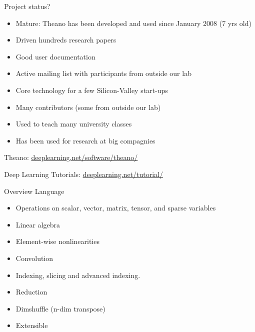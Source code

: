 \documentclass[utf8x,xcolor=pdftex,dvipsnames,table]{beamer}
\begin{document}



\begin{frame}{Project status?}
  \begin{itemize}
    \item Mature: Theano has been developed and used since January 2008 (7 yrs old)
    \item Driven hundreds research papers
    \item Good user documentation
    \item Active mailing list with participants from outside our lab
    \item Core technology for a few Silicon-Valley start-ups
    \item Many contributors (some from outside our lab)
    \item Used to teach many university classes
    \item Has been used for research at big compagnies
  \end{itemize}
  Theano: \url{deeplearning.net/software/theano/}

  Deep Learning Tutorials: \url{deeplearning.net/tutorial/}
\end{frame}



\begin{frame}{Overview Language}
  \begin{itemize}
  \item Operations on scalar, vector, matrix, tensor, and sparse variables
  \item Linear algebra
  \item Element-wise nonlinearities
  \item Convolution
  \item Indexing, slicing and advanced indexing.
  \item Reduction
  \item Dimshuffle (n-dim transpose)
  \item Extensible
  \end{itemize}
\end{frame}
\end{document}
